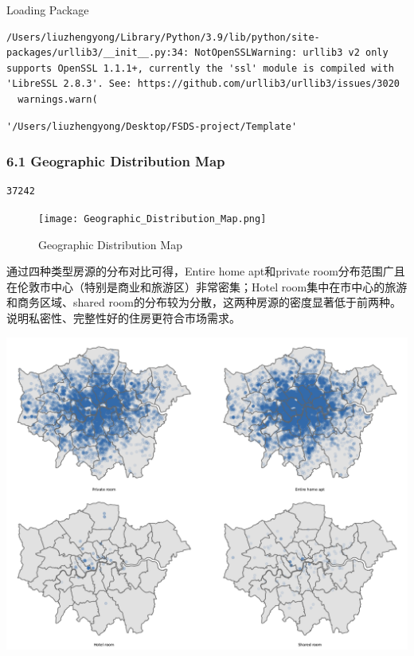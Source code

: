 \documentclass[
  letterpaper,
  DIV=11,
  numbers=noendperiod]{scrartcl}
\begin{document}
Loading Package

\begin{verbatim}
/Users/liuzhengyong/Library/Python/3.9/lib/python/site-packages/urllib3/__init__.py:34: NotOpenSSLWarning: urllib3 v2 only supports OpenSSL 1.1.1+, currently the 'ssl' module is compiled with 'LibreSSL 2.8.3'. See: https://github.com/urllib3/urllib3/issues/3020
  warnings.warn(
\end{verbatim}

\begin{verbatim}
'/Users/liuzhengyong/Desktop/FSDS-project/Template'
\end{verbatim}

\hypertarget{geographic-distribution-map}{%
\subsubsection{6.1 Geographic Distribution
Map}\label{geographic-distribution-map}}

\begin{verbatim}
37242
\end{verbatim}

\begin{figure}

{\centering \texttt{[image: Geographic\_Distribution\_Map.png]}

}

\caption{Geographic Distribution Map}

\end{figure}

通过四种类型房源的分布对比可得，Entire home apt和private
room分布范围广且在伦敦市中心（特别是商业和旅游区）非常密集；Hotel
room集中在市中心的旅游和商务区域、shared
room的分布较为分散，这两种房源的密度显著低于前两种。说明私密性、完整性好的住房更符合市场需求。

\includegraphics{Template_files/figure-pdf/cell-6-output-1.pdf}
\end{document}
